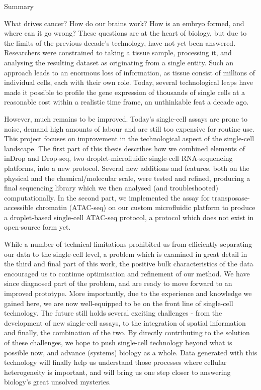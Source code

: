 {\Huge\mdseries\raggedright Summary}\pms
\bigskip
\bigskip
What drives cancer? How do our brains work? How is an embryo formed, and where can it go wrong? These questions are at the heart of biology, but due to the limits of the previous decade's technology, have not yet been answered. Researchers were constrained to taking a tissue sample, processing it, and analysing the resulting dataset as originating from a single entity. Such an approach leads to an enormous loss of information, as tissue consist of millions of individual cells, each with their own role. Today, several technological leaps have made it possible to profile the gene expression of thousands of single cells at a reasonable cost within a realistic time frame, an unthinkable feat a decade ago.\pms

However, much remains to be improved. Today's single-cell assays are prone to noise, demand high amounts of labour and are still too expensive for routine use. This project focuses on improvement in the technological aspect of the single-cell landscape. The first part of this thesis describes how we combined elements of inDrop and Drop-seq, two droplet-microfluidic single-cell RNA-sequencing platforms, into a new protocol. Several new additions and features, both on the physical and the chemical/molecular scale, were tested and refined, producing a final sequencing library which we then analysed (and troubleshooted) computationally. In the second part, we implemented the assay for transposase-accessible chromatin (ATAC-seq) on our custom microfluidic platform to produce a droplet-based single-cell ATAC-seq protocol, a protocol which does not exist in open-source form yet.\pms

While a number of technical limitations prohibited us from efficiently separating our data to the single-cell level, a problem which is examined in great detail in the third and final part of this work, the positive bulk characteristics of the data encouraged us to continue optimisation and refinement of our method. We have since diagnosed part of the problem, and are ready to move forward to an improved prototype. More importantly, due to the experience and knowledge we gained here, we are now well-equipped to be on the front line of single-cell technology. The future still holds several exciting challenges - from the development of new single-cell assays, to the integration of spatial information and finally, the combination of the two. By directly contributing to the solution of these challenges, we hope to push single-cell technology beyond what is possible now, and advance (systems) biology as a whole. Data generated with this technology will finally help us understand those processes where cellular heterogeneity is important, and will bring us one step closer to answering biology's great unsolved mysteries.\pms

